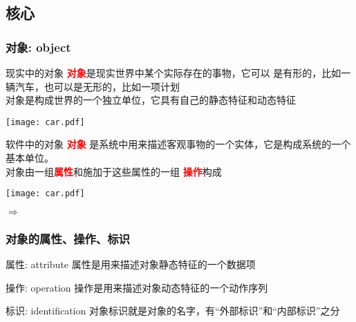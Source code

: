 \documentclass[compress]{beamer}
\begin{document}
\subsection{核心}

\begin{frame}
  \frametitle{对象: object}
   {
  \begin{block}{现实中的对象}
    \textbf{\textcolor{red}{对象}}是现实世界中某个实际存在的事物，它可以
    是有形的，比如一辆汽车，也可以是无形的，比如一项计划 \\
    对象是构成世界的一个独立单位，它具有自己的静态特征和动态特征
  \end{block}

  \begin{center}
    \centering\texttt{[image: car.pdf]}
  \end{center}
}

 {
  \begin{block}{软件中的对象}
    \textbf{\textcolor{red}{对象}}
    是系统中用来描述客观事物的一个实体，它是构成系统的一个基本单位。\\
    对象由一组\textbf{\textcolor{red}{属性}}和施加于这些属性的一组
    \textbf{\textcolor{red}{操作}}构成
  \end{block}
  \begin{center}
    \begin{minipage}[c]{.25\textwidth}
    \texttt{[image: car.pdf]}\hfill
    \end{minipage}%
    \begin{minipage}[c]{.2\textwidth}
      \centering$\Longrightarrow$
    \end{minipage}%
    \begin{minipage}[c]{.25\textwidth}


    \end{minipage}
  \end{center}
}
\end{frame}

\begin{frame}
  \frametitle{对象的属性、操作、标识}
  \begin{block}{属性: attribute}
    属性是用来描述对象静态特征的一个数据项
  \end{block}
  \begin{block}{操作: operation}
    操作是用来描述对象动态特征的一个动作序列
  \end{block}
  \begin{block}{标识: identification}
    对象标识就是对象的名字，有“外部标识”和“内部标识”之分
  \end{block}
\end{frame}
 
\end{document}
